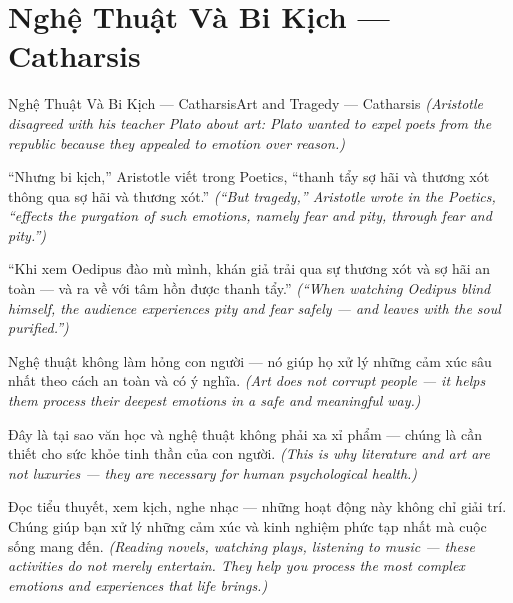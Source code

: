 \section{Nghệ Thuật Và Bi Kịch — Catharsis}
\begin{truyen}{Nghệ Thuật Và Bi Kịch — Catharsis}{Art and Tragedy — Catharsis}
\textit{(Aristotle disagreed with his teacher Plato about art: Plato wanted to expel poets from the republic because they appealed to emotion over reason.)}

``Nhưng bi kịch,'' Aristotle viết trong Poetics, ``thanh tẩy sợ hãi và thương xót thông qua sợ hãi và thương xót.''
\textit{(``But tragedy,'' Aristotle wrote in the Poetics, ``effects the purgation of such emotions, namely fear and pity, through fear and pity.'')}

``Khi xem Oedipus đào mù mình, khán giả trải qua sự thương xót và sợ hãi an toàn — và ra về với tâm hồn được thanh tẩy.''
\textit{(``When watching Oedipus blind himself, the audience experiences pity and fear safely — and leaves with the soul purified.'')}

Nghệ thuật không làm hỏng con người — nó giúp họ xử lý những cảm xúc sâu nhất theo cách an toàn và có ý nghĩa.
\textit{(Art does not corrupt people — it helps them process their deepest emotions in a safe and meaningful way.)}

Đây là tại sao văn học và nghệ thuật không phải xa xỉ phẩm — chúng là cần thiết cho sức khỏe tinh thần của con người.
\textit{(This is why literature and art are not luxuries — they are necessary for human psychological health.)}

\end{truyen}

\begin{baihoc}
Đọc tiểu thuyết, xem kịch, nghe nhạc — những hoạt động này không chỉ giải trí. Chúng giúp bạn xử lý những cảm xúc và kinh nghiệm phức tạp nhất mà cuộc sống mang đến.
\textit{(Reading novels, watching plays, listening to music — these activities do not merely entertain. They help you process the most complex emotions and experiences that life brings.)}
\end{baihoc}
